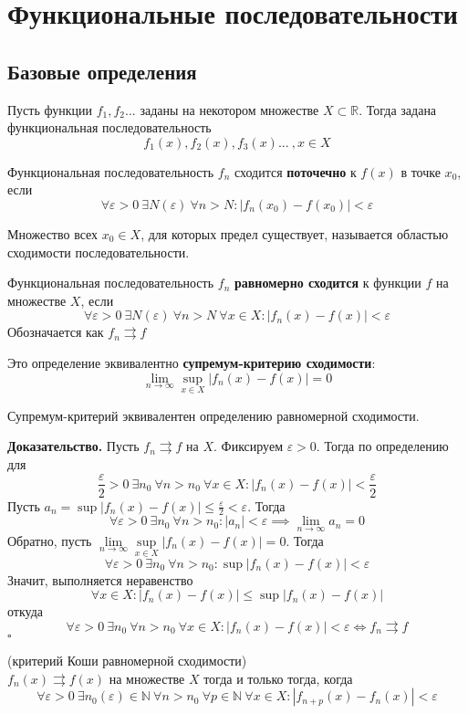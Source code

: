 \section{Функциональные последовательности}
\subsection{Базовые определения}
\begin{defin}
Пусть функции $f_1,f_2...$ заданы на некотором множестве 
$X\subset \mathbb{R}$. Тогда задана функциональная последовательность
$$f_1(x),f_2(x),f_3(x)...~,x\in X$$
\end{defin}
\begin{defin}
    Функциональная последовательность $f_n$ сходится \textbf{поточечно}
    к $f(x)$ в точке  $x_0$, если
$$\forall \varepsilon>0~\exists N(\varepsilon)~\forall n>N:
|f_n(x_0)-f(x_0)|<\varepsilon$$
\end{defin}
Множество всех $x_0\in X$, для которых
предел существует, называется областью сходимости последовательности. 
\begin{defin}
Функциональная последовательность $f_n$ \textbf{равномерно сходится} к 
функции $f$ на множестве $X$, если 
$$\forall \varepsilon>0~\exists N(\varepsilon)~\forall n>N~\forall x\in X:
|f_n(x)-f(x)|<\varepsilon$$
Обозначается как  $f_n\rightrightarrows f$
\end{defin}
Это определение эквивалентно \textbf{супремум-критерию сходимости}:
$$\lim\limits_{n \to \infty} \sup\limits_{x\in X}|f_n(x)-f(x)|=0$$
\begin{theor}
    Супремум-критерий эквивалентен определению равномерной сходимости.
\end{theor}
\textbf{Доказательство.} Пусть $f_n\rightrightarrows f$ на $X$.
Фиксируем $\varepsilon>0$. Тогда по определению для
$$\frac{\varepsilon}{2}>0~\exists n_0~\forall n>n_0~\forall x\in X:
|f_n(x)-f(x)|<\frac{\varepsilon}{2}$$
Пусть $a_n=\sup|f_n(x)-f(x)|\leqslant \frac{\varepsilon}{2}<\varepsilon$.
Тогда
$$\forall \varepsilon>0~\exists n_0~\forall n>n_0:|a_n|<\varepsilon
\implies \lim\limits_{n \to \infty} a_n=0$$
Обратно, пусть 
$\lim\limits_{n \to \infty} \sup\limits_{x\in X} |f_n(x)-f(x)|=0$. 
Тогда
$$\forall \varepsilon>0~\exists n_0~\forall n>n_0:\sup|f_n(x)-f(x)|
<\varepsilon$$
Значит, выполняется неравенство 
$$\forall x\in X:|f_n(x)-f(x)|\leqslant \sup|f_n(x)-f(x)|$$ 
откуда
$$\forall \varepsilon>0~\exists n_0~\forall n>n_0~\forall x\in X:
|f_n(x)-f(x)|<\varepsilon\iff f_n\rightrightarrows f$$
$\square$ 
\begin{theor}
    (критерий Коши равномерной сходимости)\\
    $f_n(x)\rightrightarrows f(x)$ на множестве  $X$ тогда и только тогда,
    когда
$$\forall \varepsilon>0~\exists n_0(\varepsilon)\in\mathbb{N}~\forall n>n_0~
    \forall p\in\mathbb{N}~\forall x\in X: |f_{n+p}(x)-f_n(x)|<\varepsilon$$

\end{theor}
